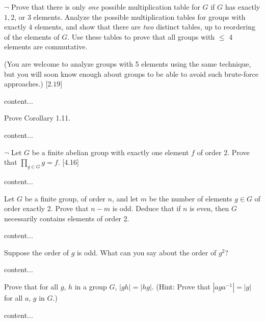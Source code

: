 \begin{exercise}
	$\neg$ Prove that there is only \emph{one} possible multiplication table for $G$ if $G$ has exactly $1,2$, or $3$ elements. Analyze the possible multiplication tables for groups with exactly $4$ elements, and show that there are \emph{two} distinct tables, up to reordering of the elements of $G$. Use these tables to prove that all groups with $\leq$ 4 elements are commutative.
	
	(You are welcome to analyze groups with 5 elements using the same technique, but you will soon know enough about groups to be able to avoid such brute-force approaches.) [$2.19$]
\end{exercise}
\begin{solution}
	content...
\end{solution}

\begin{exercise}
	Prove Corollary 1.11.
\end{exercise}
\begin{solution}
	content...
\end{solution}

\begin{exercise}
	$\neg$ Let $G$ be a finite abelian group with exactly one element $f$ of order 2. Prove that $\prod_{g\in G}g = f$. [4.16]
\end{exercise}
\begin{solution}
	content...
\end{solution}

\begin{exercise}
	Let $G$ be a finite group, of order $n$, and let $m$ be the number of elements $g\in G$ of order exactly 2. Prove that $n-m$ is odd. Deduce that if $n$ is even, then $G$ necessarily contains elements of order 2.
\end{exercise}
\begin{solution}
	content...
\end{solution}

\begin{exercise}
	Suppose the order of $g$ is odd. What can you say about the order of $g^2$?
\end{exercise}
\begin{solution}
	content...
\end{solution}

\begin{exercise}
	Prove that for all $g$, $h$ in a group $G$, $|gh| = |hg|$. (Hint: Prove that $|aga^{-1}| = |g|$ for all $a$, $g$ in $G$.)
\end{exercise}
\begin{solution}
	content...
\end{solution}

